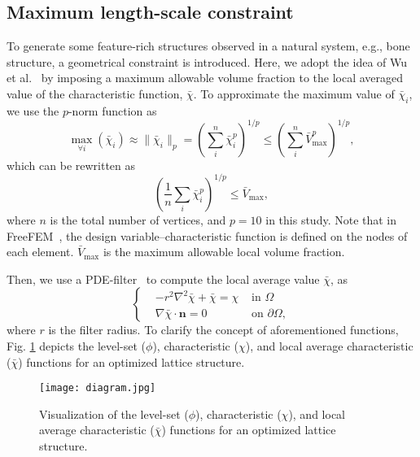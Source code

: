 \subsection{Maximum length-scale constraint}\label{Section: Maximum length-scale constraint}
To generate some feature-rich structures observed in a natural system, e.g., bone structure, a geometrical constraint is introduced. Here, we adopt the idea of Wu et al.\ \cite{wu2017infill} by imposing a maximum allowable volume fraction to the local averaged value of the characteristic function, $\bar{\chi}$. To approximate the maximum value of $\bar{\chi}_i$, we use the $p$-norm function as
\begin{equation}
\max_{\forall i} \left(\bar{\chi}_i \right) \approx  
\|\bar{\chi}_i \|_{p}=\left(\sum_i^n \bar{\chi}_{i}^{p}\right)^{1/p}
\leq \left( \sum_{i}^n \bar{V}_{\max}^p \right)^{1/p}, 
\end{equation}
which can be rewritten as
\begin{equation}
\left(\dfrac{1}{n} \sum_{i} \bar{\chi}_{i}^{p}\right)^{1 / p} \leq \bar{V}_{\max },
\end{equation}
where $n$ is the total number of vertices, and $p=10$ in this study. Note that in FreeFEM\ \cite{Hecht2012}, the design variable--characteristic function is defined on the nodes of each element. $ \bar{V}_{\max }$ is the maximum allowable local volume fraction. 

Then, we use a PDE-filter\ \cite{lazarov2011filters,kawamoto2011heaviside} to compute the local average value $\bar{\chi}$, as
\begin{equation}
	\left\{\begin{aligned}	
		& -r^2 \nabla^2 \bar{\chi} +  \bar{\chi} =  \chi & \text{ in } \Omega \\
		& \nabla \bar{\chi} \cdot \boldsymbol{n} = 0 & \text{ on } \partial \Omega,
	\end{aligned}\right.
	\label{Eq: pde filter}
\end{equation}
where $r$ is the filter radius. To clarify the concept of aforementioned functions, Fig. \ref{fig:infill_diagram} depicts the level-set ($\phi$), characteristic ($\chi$), and local average characteristic ($\bar{\chi}$) functions for an optimized lattice structure.

\begin{figure}[h]
\centering
\medskip
\texttt{[image: diagram.jpg]}
\caption[Visualization of function used for topology optimization]{Visualization of the level-set ($\phi$), characteristic ($\chi$), and local average characteristic ($\bar{\chi}$) functions for an optimized lattice structure.} \label{fig:infill_diagram}
\end{figure}

